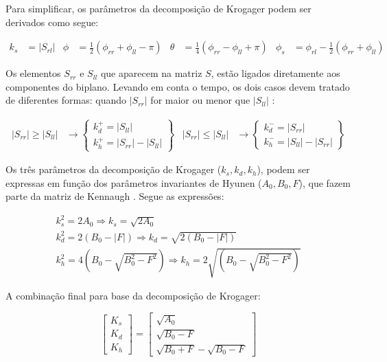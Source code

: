 \documentclass{article}
\begin{document}
Para simplificar, os parâmetros da decomposição de Krogager podem ser derivados como segue:

\begin{align}
    k_{s} &= |S_{rl}| &
    \phi &= \frac{1}{2} (\phi_{rr}+\phi_{ll}-\pi) &
    \theta &= \frac{1}{4} (\phi_{rr}-\phi_{ll}+\pi) &
    \phi_{s} &= \phi_{rl}-\frac{1}{2} (\phi_{rr}+\phi_{ll})
\end{align}

Os elementos $S_{rr}$ e $S_{ll}$ que aparecem na matriz $S$, estão ligados diretamente aos componentes do biplano. Levando em conta o tempo, os dois casos devem tratado de diferentes formas: quando  $|S_{rr}|$ for maior ou menor que $|S_{ll}|$ \cite{jong:2009}:

\begin{align}
    |S_{rr}|\geq|S_{ll}| &\rightarrow
	\begin{Bmatrix}
    	k^+_{d}=|S_{ll}| \\
    	k^+_{h}=|S_{rr}|-|S_{ll}|
	\end{Bmatrix} & 
	|S_{rr}|\leq|S_{ll}| &\rightarrow 
	\begin{Bmatrix}
    	k^-_{d}=|S_{rr}| \\
    	k^-_{h}=|S_{ll}|-|S_{rr}|
	\end{Bmatrix}
\end{align}

Os três parâmetros da decomposição de Krogager ($k_{s}, k_{d}, k_{h}$), podem ser expressas em função dos parâmetros invariantes de Hyunen ($A_{0}, B_{0}, F$), que fazem parte da matriz de Kennaugh \cite{jong:2009}. Segue as expressões:

\begin{equation}
    \begin{split}
            k^2_{s} = 2A_{0} \Rightarrow k_{s} = \sqrt{2A_{0}} \\ k^2_{d} = 2(B_{0}-|F|) \Rightarrow k_{d} = \sqrt{2(B_{0}-|F|)} \\
            k^2_{h} = 4(B_{0}-\sqrt{B^2_{0}-F^2}) \Rightarrow k_{h} = 2\sqrt{(B_{0}-\sqrt{B^2_{0}-F^2})}
    \end{split}
\end{equation}

A combinação final para base da decomposição de Krogager:

\begin{equation}
    \begin{bmatrix}
        K_{s} \\
	    K_{d}\\
	    K_{h}
    \end{bmatrix} = 
    \begin{bmatrix}
        \sqrt{A_{0}} \\
	    \sqrt{B_{0}-F} \\
	    \sqrt{B_{0}+F} - \sqrt{B_{0}-F}
    \end{bmatrix}
\end{equation}
\end{document}
